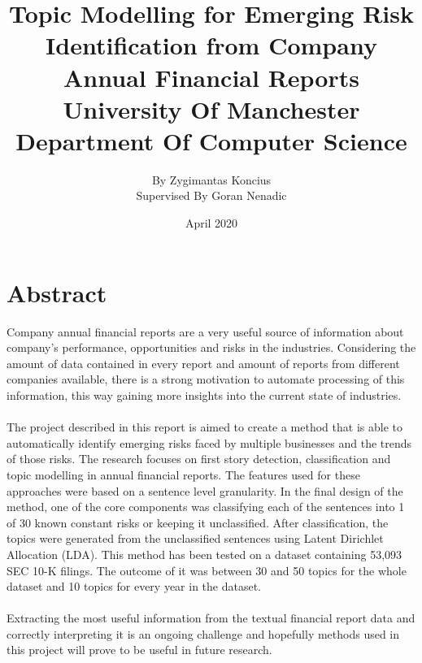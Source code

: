 \documentclass[12pt]{report}
\begin{document}


\title{
{Topic Modelling for Emerging Risk Identification from Company Annual Financial Reports}\\
{\large University Of Manchester}\\
{\large Department Of Computer Science}\\}
\author{By Zygimantas Koncius\\Supervised By Goran Nenadic}
\date{April 2020}
\maketitle

\chapter*{Abstract}
Company annual financial reports are a very useful source of information about company's performance, opportunities and risks in the industries. Considering the amount of data contained in every report and amount of reports from different companies available, there is a strong motivation to automate processing of this information, this way gaining more insights into the current state of industries.
\\\\
The project described in this report is aimed to create a method that is able to automatically identify emerging risks faced by multiple businesses and the trends of those risks. The research focuses on first story detection, classification and topic modelling in annual financial reports. The features used for these approaches were based on a sentence level granularity. In the final design of the method, one of the core components was classifying each of the sentences into 1 of 30 known constant risks or keeping it unclassified. After classification, the topics were generated from the unclassified sentences using Latent Dirichlet Allocation (LDA). This method has been tested on a dataset containing 53,093 SEC 10-K filings. The outcome of it was between 30 and 50 topics for the whole dataset and 10 topics for every year in the dataset.
\\\\
Extracting the most useful information from the textual financial report data and correctly interpreting it is an ongoing challenge and hopefully methods used in this project will prove to be useful in future research.
\end{document}

